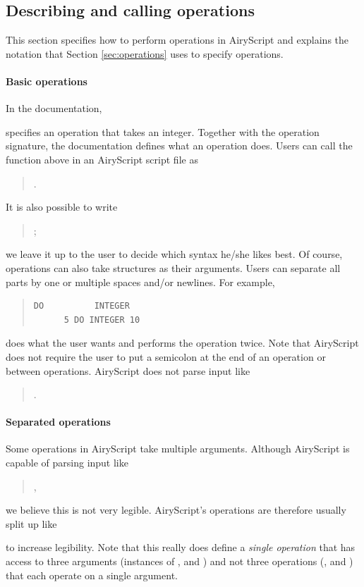 \subsection{Describing and calling operations}
\label{sec:operations_spec}
This section specifies how to perform operations in AiryScript and explains the
notation that Section \ref{sec:operations} uses to specify operations.


\paragraph{Basic operations}
In the documentation,
\begin{quote}
\end{quote}
specifies an operation that takes an integer. Together with the operation
signature, the documentation defines what an operation does. Users can call the
function above in an AiryScript script file as
\begin{quote}
  .
\end{quote}
It is also possible to write
\begin{quote}
  ;
\end{quote}
we leave it up to the user to decide which syntax he/she likes best.
Of course, operations can also take structures as their arguments. Users can
separate all parts by one or multiple spaces and/or newlines. For example,
\begin{quote}
\begin{verbatim}
DO          INTEGER
      5 DO INTEGER 10
\end{verbatim}
\end{quote}
does what the user wants and performs the operation  twice.
Note that AiryScript does not require the user to put a semicolon at the end of
an operation or between operations.
AiryScript does not parse input like
\begin{quote}
   .
\end{quote}

\paragraph{Separated operations}
Some operations in AiryScript take multiple arguments. Although AiryScript is
capable of parsing input like
\begin{quote}
  ,
\end{quote}
we believe this is not very legible. AiryScript’s operations are therefore
usually split up like
\begin{quote}
\end{quote}
to increase legibility. Note that this really does define a \emph{single
operation} that has access to three arguments (instances of ,
 and ) and not three operations (, 
and ) that each operate on a single argument.

